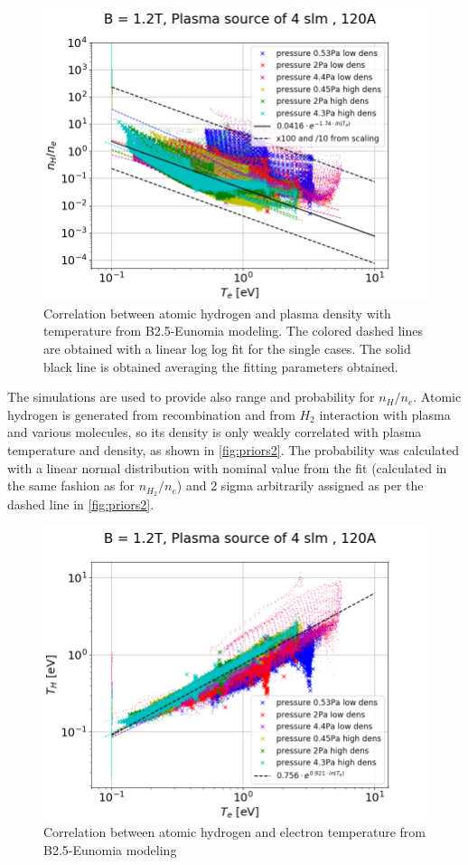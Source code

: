 \begin{figure}
	\centering
	\includegraphics[width=0.7\linewidth,trim={0 0 30 45},clip]{Chapters/chapter3/figs/nH_ne3.png}
	\caption{Correlation between atomic hydrogen and plasma density with temperature from B2.5-Eunomia modeling. The colored dashed lines are obtained with a linear log log fit for the single cases. The solid black line is obtained averaging the fitting parameters obtained.}
	\label{fig:priors2}
\end{figure}

The simulations are used to provide also range and probability for $n_H/n_e$. Atomic hydrogen is generated from recombination and from $H_2$ interaction with plasma and various molecules, so its density is only weakly correlated with plasma temperature and density, as shown in \autoref{fig:priors2}. 
The probability was calculated with a linear normal distribution with nominal value from the fit (calculated in the same fashion as for $n_{H_2}/n_e$) and 2 sigma arbitrarily assigned as per the dashed line in \autoref{fig:priors2}.

\begin{figure}
	\centering
	\includegraphics[width=0.7\linewidth,trim={0 0 30 45},clip]{Chapters/chapter3/figs/TH_Te3.png}
	\caption{Correlation between atomic hydrogen and electron temperature from B2.5-Eunomia modeling}
	\label{fig:priors3}
\end{figure}

